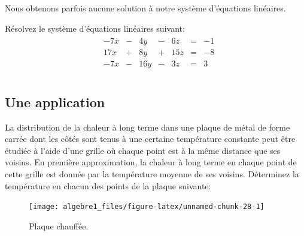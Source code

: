 \documentclass[]{book}
\theoremstyle{definition}
\theoremstyle{definition}
\theoremstyle{definition}
\theoremstyle{remark}
\let\BeginKnitrBlock\begin \let\EndKnitrBlock\end
\begin{document}
Nous obtenons parfois aucune solution à notre système d'équations linéaires.

\BeginKnitrBlock{example}
\protect\hypertarget{exm:unnamed-chunk-27}{}{\label{exm:unnamed-chunk-27} }Résolvez le système d'équations linéaires suivant:
\begin{align*}
\begin{array}{cccccccc}
&-7x&-&4y&-&6z&=&-1\\
&17x&+&8y&+&15z&=&-8\\
&-7x&-&16y&-&3z&=&3\\
\end{array}
\end{align*}
\EndKnitrBlock{example}

\hypertarget{une-application}{%
\subsection{Une application}\label{une-application}}

\BeginKnitrBlock{example}
\protect\hypertarget{exm:plaque2d}{}{\label{exm:plaque2d} }La distribution de la chaleur à long terme dans une plaque de métal de forme carrée dont les côtés sont tenus à une certaine température constante peut être étudiée à l'aide d'une grille où chaque point est à la même distance que ses voisins. En première approximation, la chaleur à long terme en chaque point de cette grille est donnée par la température moyenne de ses voisins. Déterminez la température en chacun des points de la plaque suivante:
\EndKnitrBlock{example}

\begin{figure}

{\centering \texttt{[image: algebre1\_files/figure-latex/unnamed-chunk-28-1]} 

}

\caption{Plaque chauffée.}\label{fig:unnamed-chunk-28}
\end{figure}
\end{document}
